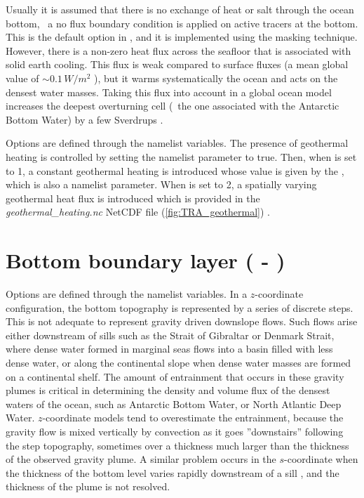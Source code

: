 \documentclass[../main/NEMO_manual]{subfiles}
\begin{document}
Usually it is assumed that there is no exchange of heat or salt through the ocean bottom,
\ie\ a no flux boundary condition is applied on active tracers at the bottom.
This is the default option in \NEMO, and it is implemented using the masking technique.
However, there is a non-zero heat flux across the seafloor that
is associated with solid earth cooling.
This flux is weak compared to surface fluxes
(a mean global value of $\sim 0.1 \, W/m^2$ \citep{stein.stein_N92}),
but it warms systematically the ocean and acts on the densest water masses.
Taking this flux into account in a global ocean model increases the deepest overturning cell
(\ie\ the one associated with the Antarctic Bottom Water) by
a few Sverdrups \citep{emile-geay.madec_OS09}.

Options are defined through the  namelist variables.
The presence of geothermal heating is controlled by
setting the namelist parameter  to true.
Then, when  is set to 1, a constant geothermal heating is introduced whose
value is given by the , which is also a namelist parameter.
When  is set to 2,
a spatially varying geothermal heat flux is introduced which is provided in
the \textit{geothermal\_heating.nc} NetCDF file
(\autoref{fig:TRA_geothermal}) \citep{emile-geay.madec_OS09}.

\section[Bottom boundary layer (\textit{trabbl.F90} - \forcode{ln_trabbl})]{Bottom boundary layer (\protect{} - \protect{})}
\label{sec:TRA_bbl}

\begin{listing}
  \caption{}
  \label{lst:nambbl}
\end{listing}

Options are defined through the  namelist variables.
In a $z$-coordinate configuration, the bottom topography is represented by a series of discrete steps.
This is not adequate to represent gravity driven downslope flows.
Such flows arise either downstream of sills such as the Strait of Gibraltar or Denmark Strait,
where dense water formed in marginal seas flows into a basin filled with less dense water,
or along the continental slope when dense water masses are formed on a continental shelf.
The amount of entrainment that occurs in these gravity plumes is critical in
determining the density and volume flux of the densest waters of the ocean,
such as Antarctic Bottom Water, or North Atlantic Deep Water.
$z$-coordinate models tend to overestimate the entrainment,
because the gravity flow is mixed vertically by convection as
it goes ''downstairs'' following the step topography,
sometimes over a thickness much larger than the thickness of the observed gravity plume.
A similar problem occurs in the $s$-coordinate when
the thickness of the bottom level varies rapidly downstream of a sill
\citep{willebrand.barnier.ea_PO01}, and the thickness of the plume is not resolved.
\end{document}

